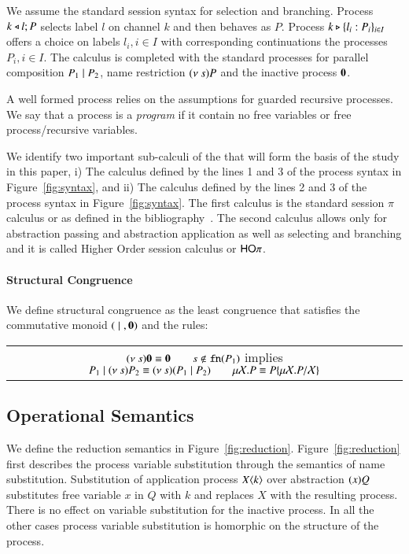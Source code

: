 We assume the standard session syntax for selection and branching. Process
$k \triangleleft l ; P$ selects label $l$ on channel $k$ and then behaves as $P$. Process 
$k \triangleright \{l_i:P_i\}_{i \in I}$ offers a choice on labels $l_i, i \in I$ with
corresponding continuations the processes $P_i, i \in I$.
The calculus is completed with the standard processes for parallel composition $P_1 \;|\; P_2$,
name restriction $(\nu\ s) P$ and the inactive process $\mathbf{0}$.

A well formed process relies on the assumptions for guarded recursive processes.
We say that a process is a \emph{program} if it contain 
no free variables or free process/recursive variables.



We identify two important sub-calculi of the \fHOp that will form
the basis of the study in this paper, i) The calculus defined by the lines 1 and 3 of the
process syntax in Figure~\ref{fig:syntax}, and ii) The calculus defined by the lines 2 and 3
of the process syntax in Figure~\ref{fig:syntax}. The first calculus is the standard
session $\pi$ calculus or \sesp as defined in the bibliography~\cite{}. The second
calculus allows only for abstraction passing and abstraction application as well 
as selecting and branching and it is called Higher Order session calculus or $\mathsf{HO}\pi$.

\paragraph{Structural Congruence}

We define structural congruence as the least congruence that satisfies the commutative monoid $(\;|\;, \mathbf{0})$
and the rules:

\begin{tabular}{c}
	$(\nu\ s) \mathbf{0} \equiv \mathbf{0} \qquad
	s \notin \mathtt{fn}(P_1)$ implies $P_1 \;|\; (\nu\ s) P_2 \equiv (\nu\ s)(P_1 \;|\; P_2)
	\qquad \mu \mathcal{X}. P \equiv P\{\mu \mathcal{X}. P/\mathcal{X} \}$
\end{tabular}

\subsection{Operational Semantics}

We define the reduction semantics in Figure~\ref{fig:reduction}.
Figure~\ref{fig:reduction} first describes the process variable
substitution through the semantics
of name substitution. Substitution of application process $X\langle k \rangle$
over abstraction $(x)Q$ substitutes free variable
$x$ in $Q$ with $k$ and replaces $X$ with the resulting process.
There is no effect on variable substitution for the inactive process.
In all the other cases process variable substitution is homorphic 
on the structure of the process.



